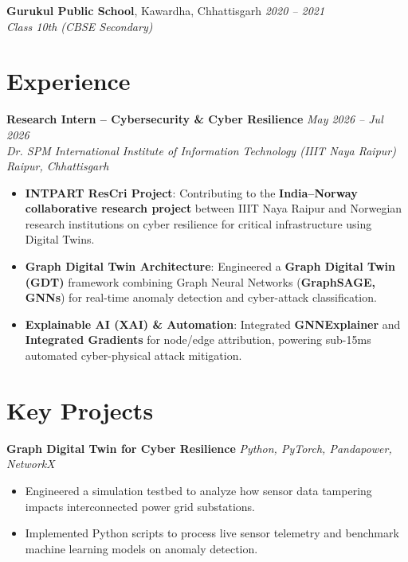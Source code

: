 \documentclass[a4paper,10pt]{article}
\begin{document}
\vspace{1.5pt}
\noindent\textbf{Gurukul Public School}, Kawardha, Chhattisgarh \hfill \textit{2020 -- 2021} \\
\textit{Class 10th (CBSE Secondary)}

\section{Experience}

\noindent\textbf{Research Intern -- Cybersecurity \& Cyber Resilience} \hfill \textit{May 2026 -- Jul 2026} \\
\textit{Dr. SPM International Institute of Information Technology (IIIT Naya Raipur)} \hfill \textit{Raipur, Chhattisgarh}
\begin{itemize}
    \item \textbf{INTPART ResCri Project}: Contributing to the \textbf{India--Norway collaborative research project} between IIIT Naya Raipur and Norwegian research institutions on cyber resilience for critical infrastructure using Digital Twins.
    \item \textbf{Graph Digital Twin Architecture}: Engineered a \textbf{Graph Digital Twin (GDT)} framework combining Graph Neural Networks (\textbf{GraphSAGE, GNNs}) for real-time anomaly detection and cyber-attack classification.
    \item \textbf{Explainable AI (XAI) \& Automation}: Integrated \textbf{GNNExplainer} and \textbf{Integrated Gradients} for node/edge attribution, powering sub-15ms automated cyber-physical attack mitigation.
\end{itemize}

\section{Key Projects}

\noindent\textbf{Graph Digital Twin for Cyber Resilience} \hfill \textit{Python, PyTorch, Pandapower, NetworkX}
\begin{itemize}
    \item Engineered a simulation testbed to analyze how sensor data tampering impacts interconnected power grid substations.
    \item Implemented Python scripts to process live sensor telemetry and benchmark machine learning models on anomaly detection.
\end{itemize}
\end{document}
